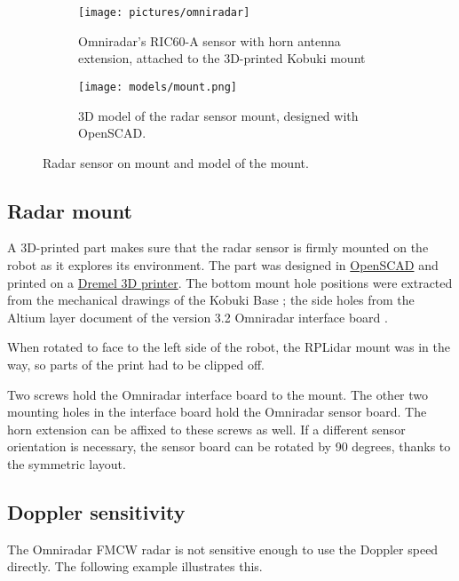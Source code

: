 \begin{figure}[htbp]
    \centering
    \begin{subfigure}[b]{0.45\textwidth}
        \label{fig:omniradar}
        \texttt{[image: pictures/omniradar]}
        \caption{Omniradar's RIC60-A sensor with horn antenna extension, attached to the 3D-printed Kobuki mount}
    \end{subfigure}
    \hfill
    \begin{subfigure}[b]{0.45\textwidth}
        \centering
        \label{fig:mount}
        \texttt{[image: models/mount.png]}
        \caption{3D model of the radar sensor mount, designed with OpenSCAD.\bigskip}
    \end{subfigure}
    \caption{Radar sensor on mount and model of the mount.}
\end{figure}


\subsection{Radar mount}\label{radar-mount}

A 3D-printed part makes sure that the radar sensor is firmly mounted on
the robot as it explores its environment. The part was designed in
\href{http://www.openscad.org/}{OpenSCAD} and printed on a
\href{https://3dprinter.dremel.com/}{Dremel 3D printer}. The bottom
mount hole positions were extracted from the mechanical drawings of the
Kobuki Base \cite{YujinRobot2012}; the side holes from the Altium layer
document of the version 3.2 Omniradar interface board
\cite{Omniradar2014}.

When rotated to face to the left side of the robot, the RPLidar mount
was in the way, so parts of the print had to be clipped off.

Two screws hold the Omniradar interface board to the mount. The other
two mounting holes in the interface board hold the Omniradar sensor
board. The horn extension can be affixed to these screws as well. If a
different sensor orientation is necessary, the sensor board can be
rotated by 90 degrees, thanks to the symmetric layout.

\subsection{Doppler sensitivity}\label{doppler-sensitivity}

The Omniradar FMCW radar is not sensitive enough to use the Doppler
speed directly. The following example illustrates this.

